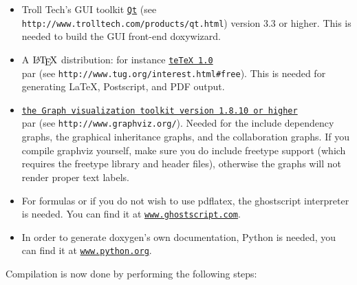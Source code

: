 \begin{itemize}
\item Troll Tech's GUI toolkit \href{http://www.trolltech.com/products/qt.html}{\tt Qt}  (see {\tt http://www.trolltech.com/products/qt.html})  version 3.3 or higher. This is needed to build the GUI front-end doxywizard. \item A $\mbox{\LaTeX}$ distribution: for instance \href{http://www.tug.org/interest.html#free}{\tt teTeX 1.0}  \\par (see {\tt http://www.tug.org/interest.html\#free}). This is needed for generating LaTeX, Postscript, and PDF output. \item \href{http://www.graphviz.org/}{\tt the Graph visualization toolkit version 1.8.10 or higher}  \\par (see {\tt http://www.graphviz.org/}). Needed for the include dependency graphs, the graphical inheritance graphs, and the collaboration graphs. If you compile graphviz yourself, make sure you do include freetype support (which requires the freetype library and header files), otherwise the graphs will not render proper text labels. \item For formulas or if you do not wish to use pdflatex, the ghostscript interpreter is needed. You can find it at \href{http://www.ghostscript.com/}{\tt www.ghostscript.com}. \item In order to generate doxygen's own documentation, Python is needed, you can find it at \href{http://www.python.org}{\tt www.python.org}. \end{itemize}


Compilation is now done by performing the following steps:

